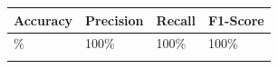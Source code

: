
{\def\LTcaptype{none} %
\begin{longtable}[]{@{}llll@{}}
\toprule\noalign{}
\textbf{Accuracy} & \textbf{Precision} & \textbf{Recall} &
\textbf{F1-Score} \\
\midrule\noalign{}
\endhead
100\% & 100\% & 100\% & 100\% \\
\bottomrule\noalign{}
\end{longtable}
}

